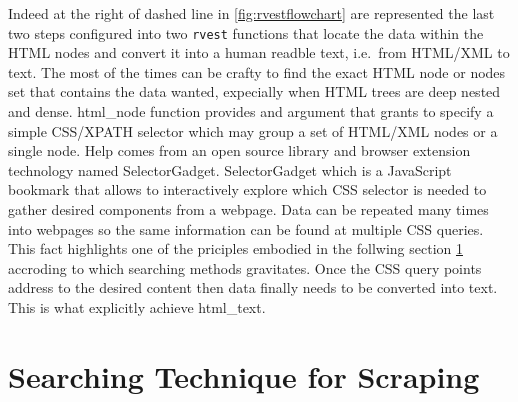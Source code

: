 \documentclass[
  12pt,
  a4paper,
  oneside]{book}
\newcommand{\passthrough}[1]{#1}
\theoremstyle{definition}
\theoremstyle{definition}
\theoremstyle{definition}
\theoremstyle{remark}
\begin{document}
Indeed at the right of dashed line in \ref{fig:rvestflowchart} are represented the last two steps configured into two \passthrough{\lstinline!rvest!}\citep{rvest} functions that locate the data within the HTML nodes and convert it into a human readble text, i.e.~from HTML/XML to text. The most of the times can be crafty to find the exact HTML node or nodes set that contains the data wanted, expecially when HTML trees are deep nested and dense. html\_node function provides and argument that grants to specify a simple CSS/XPATH selector which may group a set of HTML/XML nodes or a single node. Help comes from an open source library and browser extension technology named SelectorGadget. SelectorGadget \citep{Selectorgadget} which is a JavaScript bookmark that allows to interactively explore which CSS selector is needed to gather desired components from a webpage. Data can be repeated many times into webpages so the same information can be found at multiple CSS queries. This fact highlights one of the priciples embodied in the follwing section \ref{ProperScraping} accroding to which searching methods gravitates. Once the CSS query points address to the desired content then data finally needs to be converted into text. This is what explicitly achieve html\_text.

\hypertarget{ProperScraping}{%
\section{Searching Technique for Scraping}\label{ProperScraping}}
\end{document}
